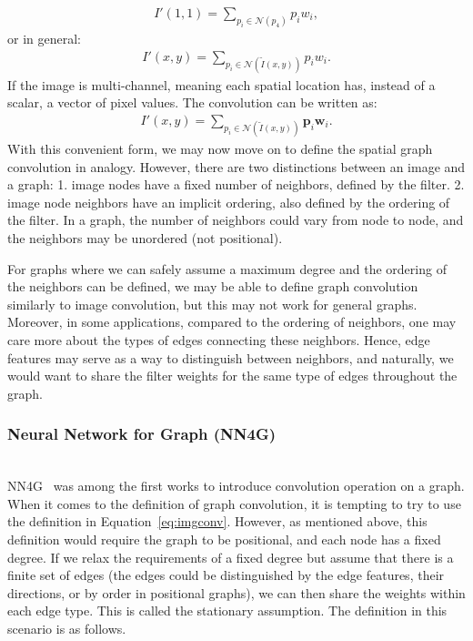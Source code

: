\begin{gather}
I'(1, 1) = \sum_{p_i \in \mathcal {N}(p_4)} p_i w_i,
\end{gather}
or in general:
\begin{gather}
I'(x, y) = \sum_{p_i \in \mathcal {N}(\tilde I(x, y))} p_i w_i.
\end{gather}
If the image is multi-channel, meaning each spatial location has, instead of a scalar, a vector of pixel values. The convolution can be written as:
\begin{gather}
\label{eq:imgconv}
I'(x, y) = \sum_{p_i \in \mathcal {N}(\tilde I(x, y))} \mathbf{p}_i \mathbf{w}_i.
\end{gather}
With this convenient form, we may now move on to define the spatial graph convolution in analogy. However, there are two distinctions between an image and a graph: 1. image nodes have a fixed number of neighbors, defined by the filter. 2. image node neighbors have an implicit ordering, also defined by the ordering of the filter. In a graph, the number of neighbors could vary from node to node, and the neighbors may be unordered (not positional). 

For graphs where we can safely assume a maximum degree and the ordering of the neighbors can be defined, we may be able to define graph convolution similarly to image convolution, but this may not work for general graphs. Moreover, in some applications, compared to the ordering of neighbors, one may care more about the types of edges connecting these neighbors. Hence, edge features may serve as a way to distinguish between neighbors, and naturally, we would want to share the filter weights for the same type of edges throughout the graph. 





\subsubsection{Neural Network for Graph (NN4G)} \hfill \\
NN4G~\cite{nn4g} was among the first works to introduce convolution operation on a graph. When it comes to the definition of graph convolution, it is tempting to try to use the definition in Equation~\ref{eq:imgconv}. However, as mentioned above, this definition would require the graph to be positional, and each node has a fixed degree. If we relax the requirements of a fixed degree but assume that there is a finite set of edges (the edges could be distinguished by the edge features, their directions, or by order in positional graphs), we can then share the weights within each edge type. This is called the stationary assumption. The definition in this scenario is as follows.

